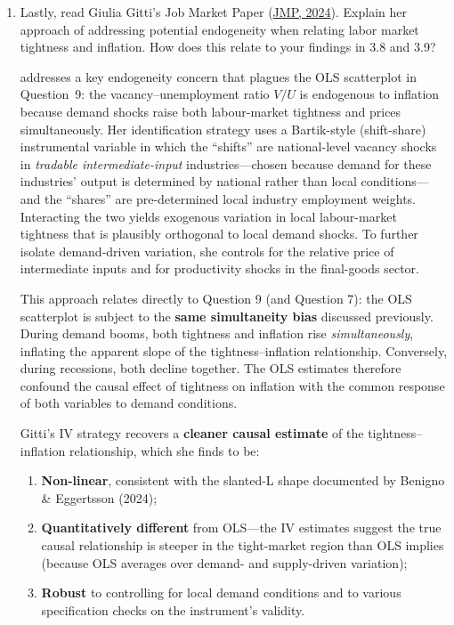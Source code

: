 \documentclass[dvipsnames,11pt]{article}
\begin{document}
\begin{enumerate}[resume]
\begin{solution}
                \end{solution}

            \item Lastly, read Giulia Gitti's Job Market Paper (\href{https://drive.google.com/file/d/1ZD9WUJ06xZFO8bhZsQyy3tZZfk2yC8oH/view}{JMP, 2024}). Explain her approach of addressing potential endogeneity when relating labor market tightness and inflation. How does this relate to your findings in 3.8 and 3.9?

                \begin{solution}

                    \textcite{gitti2024nonlinearities} addresses a key endogeneity concern that plagues the OLS scatterplot in Question~9: the vacancy--unemployment ratio $V/U$ is endogenous to inflation because demand shocks raise both labour-market tightness and prices simultaneously. Her identification strategy uses a Bartik-style (shift-share) instrumental variable in which the ``shifts'' are national-level vacancy shocks in \emph{tradable intermediate-input} industries---chosen because demand for these industries' output is determined by national rather than local conditions---and the ``shares'' are pre-determined local industry employment weights. Interacting the two yields exogenous variation in local labour-market tightness that is plausibly orthogonal to local demand shocks. To further isolate demand-driven variation, she controls for the relative price of intermediate inputs and for productivity shocks in the final-goods sector.
                    
                    This approach relates directly to Question 9 (and Question 7): the OLS scatterplot is subject to the \textbf{same simultaneity bias} discussed previously. During demand booms, both tightness and inflation rise \emph{simultaneously}, inflating the apparent slope of the tightness--inflation relationship. Conversely, during recessions, both decline together. The OLS estimates therefore confound the causal effect of tightness on inflation with the common response of both variables to demand conditions.
                    
                    Gitti's IV strategy recovers a \textbf{cleaner causal estimate} of the tightness--inflation relationship, which she finds to be:
                    
                    \begin{enumerate}
                        \item \textbf{Non-linear}, consistent with the slanted-L shape documented by Benigno \& Eggertsson (2024);
                        \item \textbf{Quantitatively different} from OLS---the IV estimates suggest the true causal relationship is steeper in the tight-market region than OLS implies (because OLS averages over demand- and supply-driven variation);
                        \item \textbf{Robust} to controlling for local demand conditions and to various specification checks on the instrument's validity.
                    \end{enumerate}
                    

\end{solution}
\end{enumerate}
\end{document}

